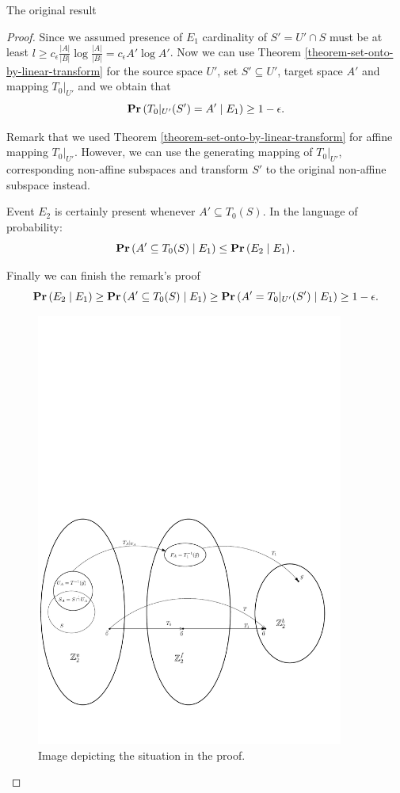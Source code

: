 \begin{section}{The original result}
\begin{proof}
Since we assumed presence of $E_1$ cardinality of $S' = U' \cap S$ must be at least $l \geq c_{\epsilon}\frac{|A|}{|B|} \log\frac{|A|}{|B|} = c_{\epsilon}{A'}\log{A'}$. Now we can use Theorem \ref{theorem-set-onto-by-linear-transform} for the source space $U'$, set $S' \subseteq U'$, target space $A'$ and mapping $T_0|_{U'}$ and we obtain that 
\[
	\mathbf{Pr}\left(T_0|_{U'}(S') = A' \mid E_1\right) \geq 1 - \epsilon \text{.}
\]

Remark that we used Theorem \ref{theorem-set-onto-by-linear-transform} for affine mapping $T_0|_{U'}$. However, we can use the generating mapping of $T_0|_{U'}$, corresponding non-affine subspaces and transform $S'$ to the original non-affine subspace instead.

Event $E_2$ is certainly present whenever $A' \subseteq T_0(S)$. In the language of probability:
\[
	\mathbf{Pr}\left(A' \subseteq T_0(S) \mid E_1\right) \leq \mathbf{Pr}\left(E_2 \mid E_1\right) \text{.}
\]

Finally we can finish the remark's proof
\[
	\mathbf{Pr}\left(E_2 \mid E_1\right) \geq \mathbf{Pr}\left(A' \subseteq T_0(S) \mid E_1\right) \geq \mathbf{Pr}\left(A' = T_0|_{U'}(S') \mid E_1\right) \geq 1 - \epsilon \text{.}
\]

\begin{figure}
  \centering
    \includegraphics[width=0.9\textwidth]{images/elpsl_proof}
  \caption{Image depicting the situation in the proof.}
\end{figure}


\end{proof}
\end{section}
